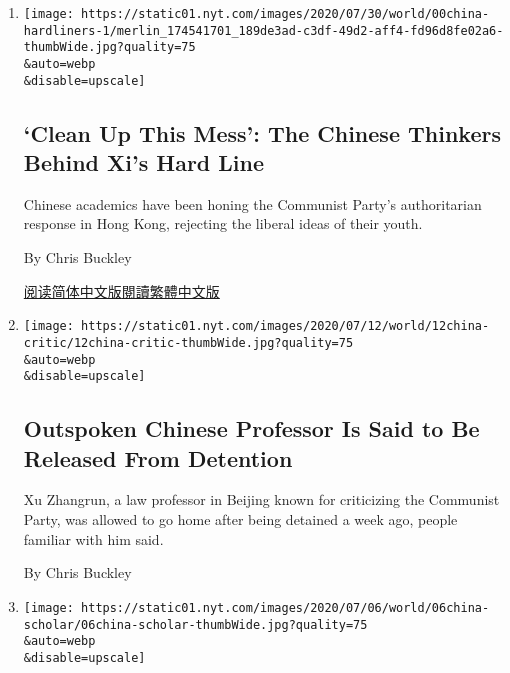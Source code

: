 \begin{enumerate}
\def\labelenumi{\arabic{enumi}.}
\item
  \href{/2020/08/02/world/asia/china-hong-kong-national-security-law.html}{}

  \texttt{[image: https://static01.nyt.com/images/2020/07/30/world/00china-hardliners-1/merlin\_174541701\_189de3ad-c3df-49d2-aff4-fd96d8fe02a6-thumbWide.jpg?quality=75\\\&auto=webp\\\&disable=upscale]}

  \hypertarget{clean-up-this-mess-the-chinese-thinkers-behind-xis-hard-line}{%
  \subsection{`Clean Up This Mess': The Chinese Thinkers Behind Xi's
  Hard
  Line}\label{clean-up-this-mess-the-chinese-thinkers-behind-xis-hard-line}}

  Chinese academics have been honing the Communist Party's authoritarian
  response in Hong Kong, rejecting the liberal ideas of their youth.

  By Chris Buckley

  \href{https://cn.nytimes.com/china/20200803/china-hong-kong-national-security-law/}{阅读简体中文版}\href{https://cn.nytimes.com/china/20200803/china-hong-kong-national-security-law/zh-hant/}{閱讀繁體中文版}
\item
  \href{/2020/07/12/world/asia/xu-zhangrun-china-xi.html}{}

  \texttt{[image: https://static01.nyt.com/images/2020/07/12/world/12china-critic/12china-critic-thumbWide.jpg?quality=75\\\&auto=webp\\\&disable=upscale]}

  \hypertarget{outspoken-chinese-professor-is-said-to-be-released-from-detention}{%
  \subsection{Outspoken Chinese Professor Is Said to Be Released From
  Detention}\label{outspoken-chinese-professor-is-said-to-be-released-from-detention}}

  Xu Zhangrun, a law professor in Beijing known for criticizing the
  Communist Party, was allowed to go home after being detained a week
  ago, people familiar with him said.

  By Chris Buckley
\item
  \href{/2020/07/06/world/asia/china-detains-xu-zhangrun-critic.html}{}

  \texttt{[image: https://static01.nyt.com/images/2020/07/06/world/06china-scholar/06china-scholar-thumbWide.jpg?quality=75\\\&auto=webp\\\&disable=upscale]}


\end{enumerate}
